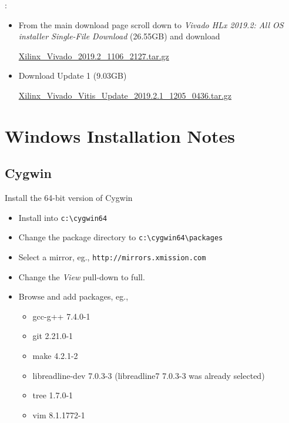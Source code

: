 \documentclass[10pt,twoside]{article}
\begin{document}
\vskip5mm
:
\begin{itemize}
\item From the main download page scroll down to \emph{Vivado HLx 2019.2: All OS installer Single-File Download}
(26.55GB) and download

\href{https://www.xilinx.com/member/forms/download/xef.html?filename=Xilinx_Vivado_2019.2_1106_2127.tar.gz}{Xilinx\_Vivado\_2019.2\_1106\_2127.tar.gz}

\item Download Update 1 (9.03GB)

\href{https://www.xilinx.com/member/forms/download/xef.html?filename=Xilinx_Vivado_Vitis_Update_2019.2.1_1205_0436.tar.gz}{Xilinx\_Vivado\_Vitis\_Update\_2019.2.1\_1205\_0436.tar.gz}

\end{itemize}

\clearpage
\section{Windows Installation Notes}

\subsection{Cygwin}

Install the 64-bit version of Cygwin
%
\begin{itemize}
\item Install into \verb+c:\cygwin64+
\item Change the package directory to \verb+c:\cygwin64\packages+
\item Select a mirror, eg., \verb+http://mirrors.xmission.com+
\item Change the \emph{View} pull-down to full.
\item Browse and add packages, eg.,
%
\begin{itemize}
\item gcc-g++ 7.4.0-1
\item git 2.21.0-1
\item make 4.2.1-2
\item libreadline-dev 7.0.3-3 (libreadline7 7.0.3-3 was already selected)
\item tree 1.7.0-1
\item vim 8.1.1772-1
\end{itemize}
%
\end{itemize}
\end{document}
